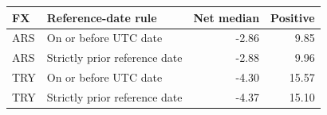 \begin{tabular}{llrr}
\toprule
FX & Reference-date rule & Net median & Positive \\
\midrule
ARS & On or before UTC date & -2.86 & 9.85 \\
ARS & Strictly prior reference date & -2.88 & 9.96 \\
TRY & On or before UTC date & -4.30 & 15.57 \\
TRY & Strictly prior reference date & -4.37 & 15.10 \\
\bottomrule
\end{tabular}
